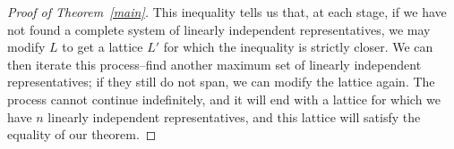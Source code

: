 \begin{proof}[Proof of Theorem~\ref{main}]
This inequality tells us that, at each stage, if we have not found a complete system of linearly independent representatives, we may modify $L$ to get a lattice $L'$ for which the inequality is strictly closer. We can then iterate this process--find another maximum set of linearly independent representatives; if they still do not span, we can modify the lattice again. The process cannot continue indefinitely, and it will end with a lattice for which we have $n$ linearly independent representatives, and this lattice will satisfy the equality of our theorem.
\end{proof}
